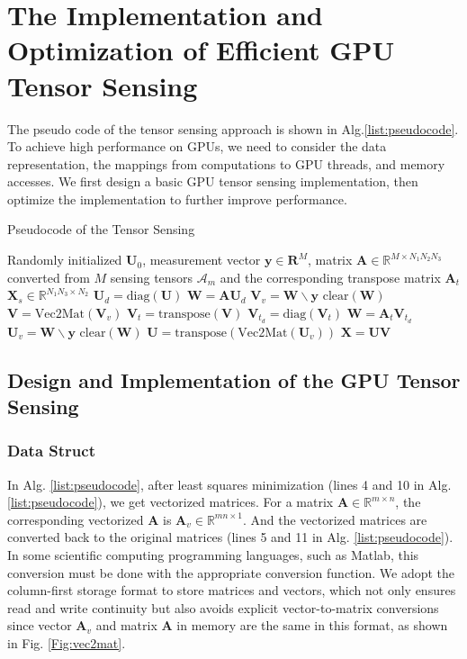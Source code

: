 \documentclass[futureinternet,article,submit,moreauthors,pdftex,10pt,a4paper]{Definitions/mdpi}
\theoremstyle{plain}
\theoremstyle{definition}
\theoremstyle{remark}
\begin{document}
\section{The Implementation and Optimization of Efficient GPU Tensor Sensing}
\label{SEC_GPU}
The pseudo code of the tensor sensing approach is shown in Alg.\ref{list:pseudocode}. To achieve high performance on GPUs, we need to consider the data representation, the mappings from computations to GPU threads, and memory accesses. We first design a basic GPU tensor sensing implementation, then optimize the implementation to further improve performance.
\begin{algorithm}
\caption{Pseudocode of the Tensor Sensing}
\label{list:pseudocode}
\begin{algorithmic}[1]
    \Require Randomly initialized $\mathbf{U}_0$, measurement vector $\mathbf{y} \in \mathbf{R}^M$, matrix $\mathbf{A} \in \mathbb{R}^{M \times N_1N_2N_3}$ converted from $M$ sensing tensors $\mathcal{A}_m$ and the corresponding transpose matrix $\mathbf{A}_t$
    \Ensure $\mathbf{X}_s \in \mathbb{R}^{N_1N_3 \times N_2}$
        \State $\mathbf{U}_{d} = \text{diag}(\mathbf{U})$
        \State $\mathbf{W} = \mathbf{A} \mathbf{U}_{d}$
        \State $\mathbf{V}_{v} = \mathbf{W} \backslash \mathbf{y}$
        \State $\text{clear}(\mathbf{W})$
        \State $\mathbf{V} = \text{Vec2Mat}(\mathbf{V}_{v})$
        \State $\mathbf{V}_t = \text{transpose}(\mathbf{V})$
        \State $\mathbf{V}_{t_{d}} = \text{diag}(\mathbf{V}_t)$
        \State $\mathbf{W} = \mathbf{A}_t \mathbf{V}_{t_{d}}$
        \State $\mathbf{U}_{v} = \mathbf{W} \backslash \mathbf{y}$
        \State $\text{clear}(\mathbf{W})$
        \State $\mathbf{U} = \text{transpose}(\text{Vec2Mat}(\mathbf{U}_{v}))$
    \EndFor
    \State \Return $\mathbf{X} = \mathbf{U} \mathbf{V}$
    \end{algorithmic}
    \end{algorithm}

\subsection{Design and Implementation of the GPU Tensor Sensing}
\subsubsection{Data Struct}
In Alg. \ref{list:pseudocode}, after least squares minimization (lines 4 and 10 in Alg. \ref{list:pseudocode}), we get vectorized matrices. For a matrix $\mathbf{A} \in \mathbb{R}^{m \times n}$, the corresponding vectorized $\mathbf{A}$ is $\mathbf{A}_v \in \mathbb{R}^{mn \times 1}$. And the vectorized matrices are converted back to the original matrices (lines 5 and 11 in Alg. \ref{list:pseudocode}). In some scientific computing programming languages, such as Matlab, this conversion must be done with the appropriate conversion function.
We adopt the column-first storage format to store matrices and vectors, which not only ensures read and write continuity but also avoids explicit vector-to-matrix conversions since vector $\mathbf{A}_v$ and matrix $\mathbf{A}$ in memory are the same in this format, as shown in Fig. \ref{Fig:vec2mat}.
\end{document}
